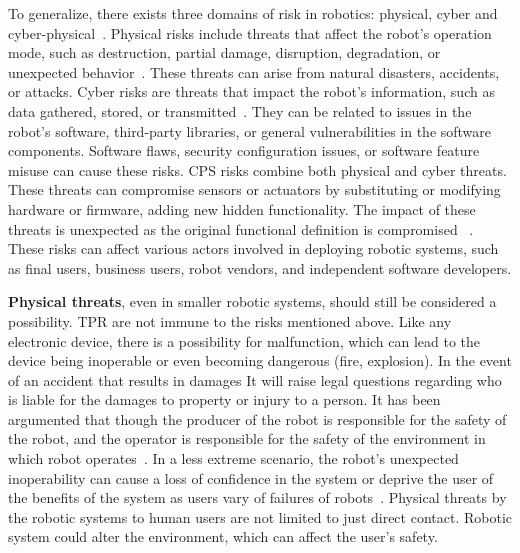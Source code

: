 To generalize, there exists three domains of risk in robotics:
physical, cyber and cyber-physical~\cite[]{cyber_sec_robotics_privacy_safety_2017}.
Physical risks include threats that affect the robot's operation mode, such as destruction, partial damage, disruption, degradation, or
unexpected behavior~\cite[77]{cyber_sec_robotics_privacy_safety_2017}. These threats can arise from natural disasters, accidents, or
attacks. Cyber risks are threats that impact the robot's information, such as data gathered, stored, or transmitted~\cite[78]{
  cyber_sec_robotics_privacy_safety_2017}. They can be related to issues in the robot's software, third-party libraries, or general vulnerabilities in the software components. Software flaws, security configuration issues, or software feature misuse can cause these risks.
\ac{CPS} risks combine both physical and cyber threats. These threats can compromise sensors or actuators by substituting or
modifying hardware or firmware, adding new hidden functionality.
The impact of these threats is unexpected as the original functional
definition is compromised ~\cite[77-78]{cyber_sec_robotics_privacy_safety_2017}. These risks can affect various actors involved in deploying robotic systems, such as final users, business users, robot vendors, and independent software developers.

\textbf{Physical threats}, even in smaller robotic systems, should still be considered a possibility. \ac{TPR} are not immune to the risks mentioned above. Like any electronic device, there is a possibility for malfunction, which can lead to the device being inoperable or even becoming dangerous (fire, explosion). In the event of an accident that results in damages
It will raise legal questions regarding who is liable for the damages to property or injury to a person. It has been argumented that though
the producer of the robot is responsible for the safety of the robot, and the operator is responsible for the safety of the environment in
which robot operates~\cite[]{if_robots_cause_harm_2016}.
In a less extreme scenario, the robot's
unexpected inoperability can cause a loss
of confidence in the system or deprive the user of the benefits of the system as users vary of failures of robots~\cite[9-10]{
  higher_edu_perception_on_tprs_2022}. Physical threats by the robotic systems to human users are not limited to just
direct contact. Robotic system could alter the environment, which can affect the user's safety.

